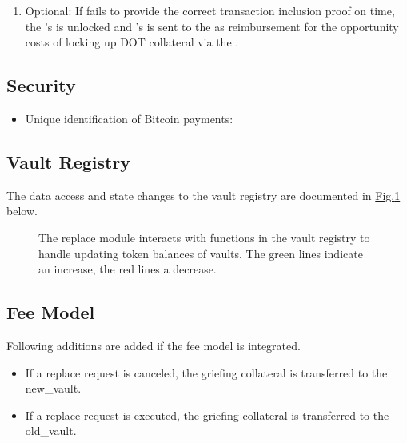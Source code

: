 \documentclass[a4paper,10pt,english]{sphinxmanual}
\begin{document}
\begin{enumerate}
\begin{itemize}
\end{itemize}

\item {} 
Optional: If  fails to provide the correct transaction inclusion proof on time, the ’s  is unlocked and ’s  is sent to the  as reimbursement for the opportunity costs of locking up DOT collateral via the {\hyperref[\detokenize{spec/replace:cancelreplace}]{}}.

\end{enumerate}


\subsection{Security}
\label{\detokenize{spec/replace:security}}\begin{itemize}
\item {} 
Unique identification of Bitcoin payments: {\hyperref[\detokenize{security_performance/security-analysis:op-return}]{}}

\end{itemize}


\subsection{Vault Registry}
\label{\detokenize{spec/replace:id1}}
The data access and state changes to the vault registry are documented in \hyperref[\detokenize{spec/replace:fig-vault-registry-replace}]{Fig.\@ \ref{\detokenize{spec/replace:fig-vault-registry-replace}}} below.

\begin{figure}[htbp]
\centering
\capstart

\noindent{}
\caption{The replace module interacts with functions in the vault registry to handle updating token balances of vaults. The green lines indicate an increase, the red lines a decrease.}\label{\detokenize{spec/replace:id18}}\label{\detokenize{spec/replace:fig-vault-registry-replace}}\end{figure}


\subsection{Fee Model}
\label{\detokenize{spec/replace:fee-model}}
Following additions are added if the fee model is integrated.
\begin{itemize}
\item {} 
If a replace request is canceled, the griefing collateral is transferred to the new\_vault.

\item {} 
If a replace request is executed, the griefing collateral is transferred to the old\_vault.

\end{itemize}
\end{document}
